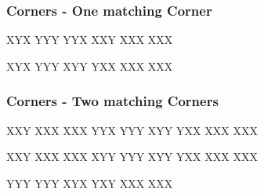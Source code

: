 \documentclass[9pt,dvipsnames]{extarticle}
\begin{document}
\begin{multicols*}{4}
\subsubsection*{Corners - One matching Corner}

\RubikCubeGreyAll%
\RubikFaceUp%
{X}{Y}{X}
{Y}{Y}{Y}
{Y}{Y}{X}%
\RubikFaceFront%
{X}{X}{Y}
{X}{X}{X}
{X}{X}{X}

\RubikCubeGreyAll%
\RubikFaceUp%
{X}{Y}{X}
{Y}{Y}{Y}
{X}{Y}{Y}
\RubikFaceFront%
{Y}{X}{X}
{X}{X}{X}
{X}{X}{X}

\subsubsection*{Corners - Two matching Corners}

\RubikCubeGreyAll%
\RubikFaceRight%
{X}{X}{Y}
{X}{X}{X}
{X}{X}{X}
\RubikFaceUp%
{Y}{Y}{X}
{Y}{Y}{Y}
{X}{Y}{Y}
\RubikFaceFront%
{Y}{X}{X}
{X}{X}{X}
{X}{X}{X}

\RubikCubeGreyAll%
\RubikFaceBack%
{X}{X}{Y}
{X}{X}{X}
{X}{X}{X}
\RubikFaceUp%
{X}{Y}{Y}
{Y}{Y}{Y}
{X}{Y}{Y}
\RubikFaceFront%
{Y}{X}{X}
{X}{X}{X}
{X}{X}{X}

\RubikCubeGreyAll%
\RubikFaceUp%
{Y}{Y}{Y}
{Y}{Y}{Y}
{X}{Y}{X}
\RubikFaceFront%
{Y}{X}{Y}
{X}{X}{X}
{X}{X}{X}


\end{multicols*}
\end{document}
